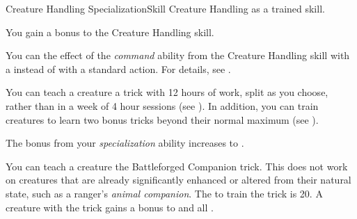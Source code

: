   \begin{feat}{Creature Handling Specialization}{Skill}
    \featpre Creature Handling as a trained skill.

     You gain a  bonus to the Creature Handling skill.

     You can  the effect of the \textit{command} ability from the Creature Handling skill with a  instead of with a standard action.
    For details, see .

     You can teach a creature a trick with 12 hours of work, split as you choose, rather than in a week of 4 hour sessions (see ).
    In addition, you can train creatures to learn two bonus tricks beyond their normal maximum (see ).

     The bonus from your \textit{specialization} ability increases to .

     You can teach a creature the Battleforged Companion trick.
    This does not work on creatures that are already significantly enhanced or altered from their natural state, such as a ranger's \textit{animal companion}.
    The  to train the trick is 20.
    A creature with the trick gains a  bonus to  and all .
  \end{feat}


